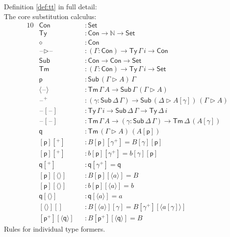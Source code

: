 \documentclass[a4paper,UKenglish,cleveref, autoref, thm-restate]{lipics-v2021}
\newcommand{\ra}{\rightarrow}
\newcommand{\Set}{\mathsf{Set}}
\newcommand{\Ty}{\mathsf{Ty}}
\newcommand{\Tm}{\mathsf{Tm}}
\newcommand{\Con}{\mathsf{Con}}
\newcommand{\Sub}{\mathsf{Sub}}
\newcommand{\p}{\mathsf{p}}
\newcommand{\q}{\mathsf{q}}
\newcommand{\ext}{\mathop{\triangleright}}
\newcommand{\N}{\mathbb{N}}
\newcommand{\blank}{\mathord{\hspace{1pt}\text{--}\hspace{1pt}}} %
\begin{document}
Definition \ref{def:tt} in full detail: \\
The core substitution calculus:
\begin{alignat*}{10}
  & \Con && : \Set \\
  & \Ty && : \Con\ra\N\ra\Set \\
  & \diamond && : \Con \\
  & \blank\ext\blank && : (\Gamma:\Con)\ra\Ty\,\Gamma\,i\ra\Con \\
  & \Sub && : \Con\ra\Con\ra\Set \\
  & \Tm && : (\Gamma:\Con)\ra\Ty\,\Gamma\,i\ra\Set \\
  & \p && : \Sub\,(\Gamma\ext A)\,\Gamma \\
  & \langle\blank\rangle && : \Tm\,\Gamma\,A\ra\Sub\,\Gamma\,(\Gamma\ext A) \\
  & \blank^+ && : (\gamma:\Sub\,\Delta\,\Gamma)\ra\Sub\,(\Delta\ext A[\gamma])\,(\Gamma\ext A) \\
  & \blank[\blank] && : \Ty\,\Gamma\,i\ra\Sub\,\Delta\,\Gamma\ra\Ty\,\Delta\,i \\
  & \blank[\blank] && : \Tm\,\Gamma\,A\ra(\gamma:\Sub\,\Delta\,\Gamma)\ra\Tm\,\Delta\,(A[\gamma]) \\
  & \q && : \Tm\,(\Gamma\ext A)\,(A[\p]) \\
  & [\p][^+] && : B[\p][\gamma^+] = B[\gamma][\p] \\
  & [\p][^+] && : b[\p][\gamma^+] = b[\gamma][\p] \\
  & \q[^+] && : \q[\gamma^+] = \q \\
  & [\p][\langle\rangle] && : B[\p][\langle a\rangle] = B \\
  & [\p][\langle\rangle] && : b[\p ][\langle a\rangle] = b \\
  & \q[\langle\rangle] && : \q[\langle a\rangle] = a \\
  & [\langle\rangle][] && : B[\langle a\rangle][\gamma] = B[\gamma^+][\langle a[\gamma]\rangle] \\
  & [\p^+][\langle\q\rangle] && : B[\p^+][\langle\q\rangle] = B
\end{alignat*}
Rules for individual type formers.
\end{document}

